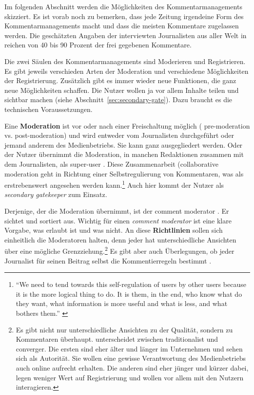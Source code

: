 Im folgenden Abschnitt werden die Möglichkeiten des Kommentarmanagements
skizziert. Es ist vorab noch zu bemerken, dass jede Zeitung irgendeine Form des
Kommentarmanagements macht und dass die meisten Kommentare zugelassen werden.
Die geschätzten Angaben der interviewten Journalisten aus aller Welt in
\textcite[S.~106]{singer} reichen von 40 bis 90 Prozent der frei gegebenen
Kommentare.

Die zwei Säulen des Kommentarmanagements sind Moderieren und Registrieren. Es
gibt jeweils verschieden Arten der Moderation und verschiedene Möglichkeiten der
Registrierung. Zusätzlich gibt es immer wieder neue Funktionen, die ganz neue
Möglichkeiten schaffen.  Die Nutzer wollen ja vor allem Inhalte teilen und
sichtbar machen (siehe Abschnitt~\ref{sec:secondary-gate}).
Dazu braucht es die technischen Voraussetzungen.

Eine {\bfseries Moderation} ist vor oder nach einer Freischaltung möglich (\glqq
pre-moderation\grqq{} vs. \glqq post-moderation\grqq) und wird entweder vom
Journalisten durchgeführt oder jemand anderem des Medienbetriebs. Sie kann ganz
ausgegliedert werden. Oder der Nutzer übernimmt die Moderation, in manchen
Redaktionen zusammen mit dem Journalisten, als \glqq super-user\grqq{}
\autocite[S.~112]{reich}. Diese Zusammenarbeit (\glqq collaborative
moderation\grqq{} \autocite[S.~109]{reich} geht in Richtung einer
Selbstregulierung von Kommentaren, was als erstrebenswert angesehen werden
kann.\footnote{``We need to tend towards this self-regulation of users by other
users because it is the more logical thing to do. It is them, in the end, who
know what do they want, what information is more useful and what is less, and
what bothers them.'' \autocite[S.~112]{reich}} Auch hier kommt der Nutzer als
\emph{secondary gatekeeper} zum Einsatz.

Derjenige, der die Moderation übernimmt, ist der \glqq comment moderator\grqq{}
\autocite[S.~68]{paulussen}. Er sichtet und sortiert aus. Wichtig für einen
{\slshape comment moderator} ist eine klare Vorgabe, was erlaubt ist und was
nicht. An diese {\bfseries Richtlinien} sollen sich einheitlich die Moderatoren
halten, denn jeder hat unterschiedliche Ansichten über eine mögliche
Grenzziehung.\footnote{Es gibt nicht nur unterschiedliche Ansichten zu der
Qualität, sondern zu Kommentaren überhaupt. \textcite{robinson} unterscheidet
zwischen \glqq traditionalist\grqq{} und \glqq converger\grqq{}. Die ersten
sind eher älter und länger im Unternehmen und sehen sich als Autorität. Sie
wollen eine gewisse Verantwortung des Medienbetriebs auch online aufrecht
erhalten. Die anderen sind eher jünger und kürzer dabei, legen weniger Wert
auf Registrierung und wollen vor allem mit den Nutzern interagieren.} Es gibt
aber auch Überlegungen, ob jeder Journalist für seinen Beitrag selbst die
Kommentierregeln bestimmt \autocite[S.~127]{singer}.

